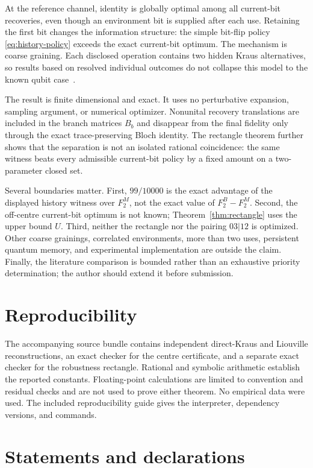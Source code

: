 \documentclass[11pt]{article}
\begin{document}
At the reference channel, identity is globally optimal among all current-bit
recoveries, even though an environment bit is supplied after each use. Retaining the
first bit changes the information structure: the simple bit-flip policy
\eqref{eq:history-policy} exceeds the exact current-bit optimum. The mechanism is
coarse graining. Each disclosed operation contains two hidden Kraus alternatives,
so results based on resolved individual outcomes do not collapse this model to the
known qubit case~\cite{GregorattiWerner2004,RexitiEtAl2024}.

The result is finite dimensional and exact. It uses no perturbative expansion,
sampling argument, or numerical optimizer. Nonunital recovery translations are
included in the branch matrices $B_b$ and disappear from the final fidelity only
through the exact trace-preserving Bloch identity. The rectangle theorem further
shows that the separation is not an isolated rational coincidence: the same witness
beats every admissible current-bit policy by a fixed amount on a two-parameter closed
set.

Several boundaries matter. First, $99/10000$ is the exact advantage of the displayed
history witness over $F_2^M$, not the exact value of $F_2^B-F_2^M$. Second, the
off-centre current-bit optimum is not known; Theorem~\ref{thm:rectangle} uses the
upper bound $U$. Third, neither the rectangle nor the pairing $03|12$ is optimized.
Other coarse grainings, correlated environments, more than two uses, persistent
quantum memory, and experimental implementation are outside the claim. Finally, the
literature comparison is bounded rather than an exhaustive priority determination;
the author should extend it before submission.

\section*{Reproducibility}

The accompanying source bundle contains independent direct-Kraus and Liouville
reconstructions, an exact checker for the centre certificate, and a separate exact
checker for the robustness rectangle. Rational and symbolic arithmetic establish the
reported constants. Floating-point calculations are limited to convention and
residual checks and are not used to prove either theorem. No empirical data were used.
The included reproducibility guide gives the interpreter, dependency versions, and
commands.

\section*{Statements and declarations}
\end{document}
